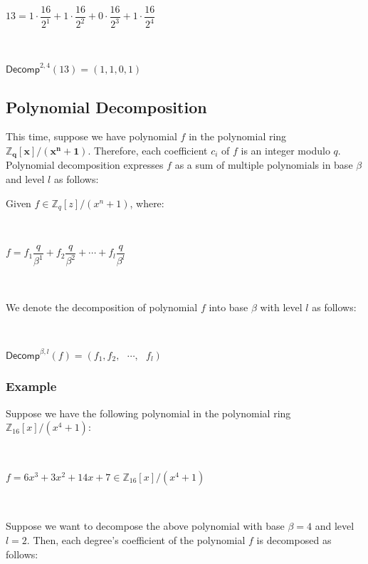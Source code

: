 $ $

$13 = 1 \cdot \dfrac{16}{2^1} + 1 \cdot \dfrac{16}{2^2} + 0 \cdot \dfrac{16}{2^3} + 1 \cdot \dfrac{16}{2^4}$

$ $

$\textsf{Decomp}^{2, 4}(13) = (1, 1, 0, 1)$


\subsection{Polynomial Decomposition}
\label{subsec:poly-decomp}

This time, suppose we have polynomial $f$ in the polynomial ring $\bm{\mathbb{Z}_q[x] / (x^n + 1)}$. Therefore, each coefficient $c_i$ of $f$ is an integer modulo $q$. Polynomial decomposition expresses $f$ as a sum of multiple polynomials in base $\beta$ and level $l$ as follows:


\begin{tcolorbox}[title={\textbf{\tboxlabel{\ref*{subsec:poly-decomp}} Polynomial Decomposition}}]

Given $f \in \mathbb{Z}_q[z]/(x^n+1)$, where:

$ $

$f = f_1 \dfrac{q}{\beta^1} + f _2\dfrac{q}{\beta^2} + \cdots + f_l \dfrac{q}{\beta^l}  $

$ $

We denote the decomposition of polynomial $f$ into base $\beta$ with level $l$ as follows:

$ $

$\textsf{Decomp}^{\beta, l}(f) = (f_1, f_2, \text{ } \cdots , \text{ } f_l)$
 $ $
\end{tcolorbox}




\subsubsection{Example}

Suppose we have the following polynomial in the polynomial ring $\mathbb{Z}_{16}[x] / (x^4 + 1)$:

$ $

$f = 6x^3 + 3x^2 + 14x + 7 \in \mathbb{Z}_{16}[x] / (x^4 + 1)$

$ $

Suppose we want to decompose the above polynomial with base $\beta = 4$ and level $l = 2$. Then, each degree's coefficient of the polynomial $f$ is decomposed as follows:

$ $


